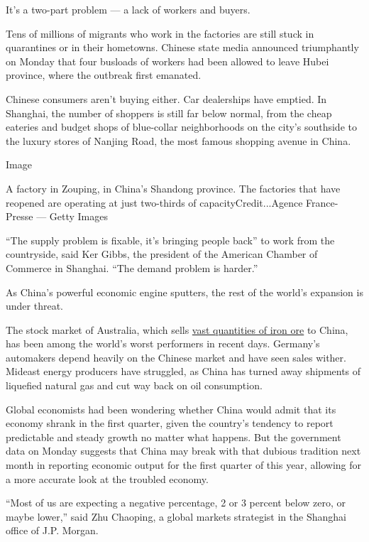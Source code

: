 It's a two-part problem --- a lack of workers and buyers.

Tens of millions of migrants who work in the factories are still stuck
in quarantines or in their hometowns. Chinese state media announced
triumphantly on Monday that four busloads of workers had been allowed to
leave Hubei province, where the outbreak first emanated.

Chinese consumers aren't buying either. Car dealerships have emptied. In
Shanghai, the number of shoppers is still far below normal, from the
cheap eateries and budget shops of blue-collar neighborhoods on the
city's southside to the luxury stores of Nanjing Road, the most famous
shopping avenue in China.

Image

A factory in Zouping, in China's Shandong province. The factories that
have reopened are operating at just two-thirds of
capacityCredit...Agence France-Presse --- Getty Images

``The supply problem is fixable, it's bringing people back'' to work
from the countryside, said Ker Gibbs, the president of the American
Chamber of Commerce in Shanghai. ``The demand problem is harder.''

As China's powerful economic engine sputters, the rest of the world's
expansion is under threat.

The stock market of Australia, which sells
\href{https://www.nytimes.com/2016/09/25/business/international/australia-china-mining-port-hedland.html}{vast
quantities of iron ore} to China, has been among the world's worst
performers in recent days. Germany's automakers depend heavily on the
Chinese market and have seen sales wither. Mideast energy producers have
struggled, as China has turned away shipments of liquefied natural gas
and cut way back on oil consumption.

Global economists had been wondering whether China would admit that its
economy shrank in the first quarter, given the country's tendency to
report predictable and steady growth no matter what happens. But the
government data on Monday suggests that China may break with that
dubious tradition next month in reporting economic output for the first
quarter of this year, allowing for a more accurate look at the troubled
economy.

``Most of us are expecting a negative percentage, 2 or 3 percent below
zero, or maybe lower,'' said Zhu Chaoping, a global markets strategist
in the Shanghai office of J.P. Morgan.

